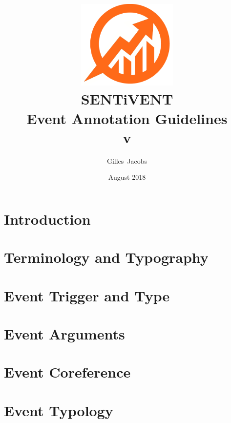 \documentclass[a4paper]{report}
\title{\includegraphics[width=5cm]{img/semalyticslogonotext.png}\\[10pt]{\huge\bfseries {\Huge S{\huge ENT}i{\huge VENT}}\\Event Annotation Guidelines\\v\vhCurrentVersion}}
\author{Gilles~Jacobs}
\date{August 2018}
\begin{document}
\maketitle
\tableofcontents
\newpage


\label{chapter/rev}

\chapter{Introduction}
\label{chapter/intro}


\chapter{Terminology and Typography}
\label{chapter/conventions}


\chapter{Event Trigger and Type}
\label{chapter/events}


\chapter{Event Arguments}
\label{chapter/arguments}


\chapter{Event Coreference}
\label{chapter/coref}


\chapter{Event Typology}
\label{chapter/eventtype}


\end{document}
